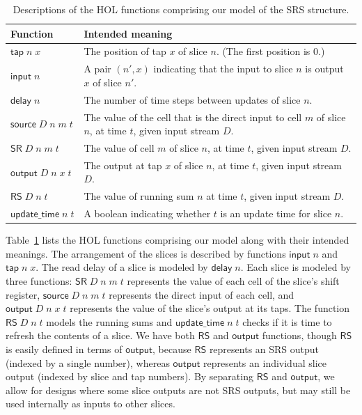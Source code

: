 \documentclass{llncs}
\begin{document}
\begin{table}[t]
\begin{tabular}{lp{}}
Function&Intended meaning\\
\hline
\(\mathsf{tap}\;n\;x\)&The position of tap $x$ of slice $n$. (The first position is $0$.)\\
\(\mathsf{input}\;n\)&A pair $(n',x)$ indicating that the input to slice $n$ is output $x$ of slice $n'$.\\
\(\mathsf{delay}\;n\)&The number of time steps between updates of slice $n$.\\
\(\mathsf{source}\;D\;n\;m\;t\)&The value of the cell that is the direct input to cell $m$ of slice $n$, at time $t$, given input stream $D$.\\
\(\mathsf{SR}\;D\;n\;m\;t\)&The value of cell $m$ of slice $n$, at time $t$, given input stream $D$.\\
\(\mathsf{output}\;D\;n\;x\;t\)&The output at tap $x$ of slice $n$, at time $t$, given input stream $D$.\\
\(\mathsf{RS}\;D\;n\;t\)&The value of running sum $n$ at time $t$, given input stream $D$.\\
\(\mathsf{update\_time}\;n\;t\)&A boolean indicating whether $t$ is an update time for slice $n$.
\end{tabular}
\vspace{2ex}
\caption{
Descriptions of the HOL functions comprising our model of the SRS structure.
\label{tab:descriptions}
}
\end{table}

Table~\ref{tab:descriptions} lists the HOL functions comprising our model along with their intended meanings.
The arrangement of the slices is described by functions $\mathsf{input}\;n$ and $\mathsf{tap}\;n\;x$.
The read delay of a slice is modeled by $\mathsf{delay}\;n$.
Each slice is modeled by three functions: $\mathsf{SR}\;D\;n\;m\;t$ represents the value of each cell of the slice's shift register, $\mathsf{source}\;D\;n\;m\;t$ represents the direct input of each cell, and $\mathsf{output}\;D\;n\;x\;t$ represents the value of the slice's output at its taps.
The function $\mathsf{RS}\;D\;n\;t$ models the running sums and $\mathsf{update\_time}\;n\;t$ checks if it is time to refresh the contents of a slice.
We have both $\mathsf{RS}$ and $\mathsf{output}$ functions, though $\mathsf{RS}$ is easily defined in terms of $\mathsf{output}$, because $\mathsf{RS}$ represents an SRS output (indexed by a single number), whereas $\mathsf{output}$ represents an individual slice output (indexed by slice and tap numbers).
By separating $\mathsf{RS}$ and $\mathsf{output}$, we allow for designs where some slice outputs are not SRS outputs, but may still be used internally as inputs to other slices.
\end{document}
